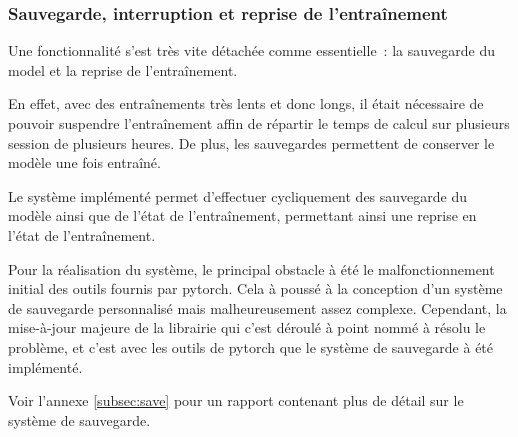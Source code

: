 
\subsubsection{Sauvegarde, interruption et reprise de l'entraînement}
Une fonctionnalité s'est très vite détachée comme essentielle~: la sauvegarde du \gls{model} et la reprise de l'entraînement.

En effet, avec des entraînements très lents et donc longs, il était nécessaire de pouvoir suspendre l'entraînement affin de répartir le temps de calcul sur plusieurs session de plusieurs heures. De plus, les sauvegardes permettent de conserver le modèle une fois entraîné.

Le système implémenté permet d'effectuer cycliquement des sauvegarde du modèle ainsi que de l'état de l'entraînement, permettant ainsi une reprise en l'état de l'entraînement.

Pour la réalisation du système, le principal obstacle à été le malfonctionnement initial des outils fournis par \gls{pytorch}.
Cela à poussé à la conception d'un système de sauvegarde personnalisé mais malheureusement assez complexe.
Cependant, la mise-à-jour majeure de la librairie qui c'est déroulé à point nommé à résolu le problème, et c'est avec les outils de \gls{pytorch} que le système de sauvegarde à été implémenté.

Voir l'annexe \ref{subsec:save} pour un rapport contenant plus de détail sur le système de sauvegarde.